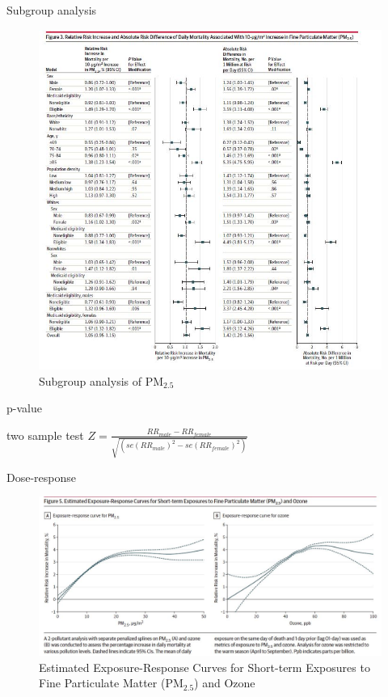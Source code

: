 \documentclass[ignorenonframetext,]{beamer}
\begin{document}
\begin{frame}{Subgroup analysis}

\begin{figure}
\centering
\includegraphics{p6.JPG}
\caption{Subgroup analysis of PM\(_{2.5}\)}
\end{figure}

\end{frame}

\begin{frame}{p-value}

two sample test
\(Z = \frac{RR_{male} - RR_{female}}{\sqrt{(se(RR_{male})^2 - se(RR_{female})^2)}}\)

\end{frame}

\begin{frame}{Dose-response}

\begin{figure}
\centering
\includegraphics{p5.JPG}
\caption{Estimated Exposure-Response Curves for Short-term Exposures to
Fine Particulate Matter (PM\(_{2.5}\)) and Ozone}
\end{figure}

\end{frame}
\end{document}
